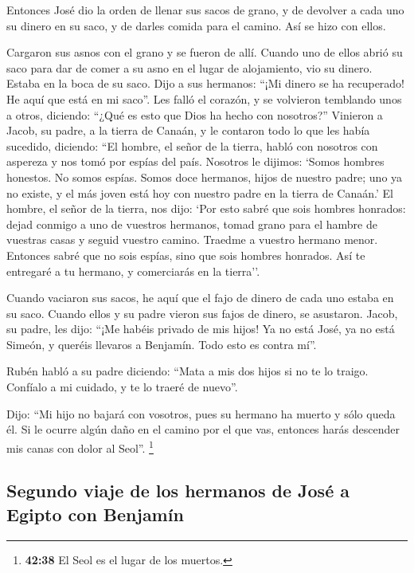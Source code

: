  Entonces José dio la orden de llenar sus sacos de grano,
y de devolver a cada uno su dinero en su saco, y de darles comida para
el camino. Así se hizo con ellos.

 Cargaron sus asnos con el grano y se fueron de allí.
 Cuando uno de ellos abrió su saco para dar de comer a su
asno en el lugar de alojamiento, vio su dinero. Estaba en la boca de su
saco.  Dijo a sus hermanos: ``¡Mi dinero se ha
recuperado! He aquí que está en mi saco''. Les falló el corazón, y se
volvieron temblando unos a otros, diciendo: ``¿Qué es esto que Dios ha
hecho con nosotros?''  Vinieron a Jacob, su padre, a la
tierra de Canaán, y le contaron todo lo que les había sucedido,
diciendo:  ``El hombre, el señor de la tierra, habló con
nosotros con aspereza y nos tomó por espías del país. 
Nosotros le dijimos: `Somos hombres honestos. No somos espías.
 Somos doce hermanos, hijos de nuestro padre; uno ya no
existe, y el más joven está hoy con nuestro padre en la tierra de
Canaán.'  El hombre, el señor de la tierra, nos dijo:
`Por esto sabré que sois hombres honrados: dejad conmigo a uno de
vuestros hermanos, tomad grano para el hambre de vuestras casas y seguid
vuestro camino.  Traedme a vuestro hermano menor.
Entonces sabré que no sois espías, sino que sois hombres honrados. Así
te entregaré a tu hermano, y comerciarás en la tierra''.

 Cuando vaciaron sus sacos, he aquí que el fajo de dinero
de cada uno estaba en su saco. Cuando ellos y su padre vieron sus fajos
de dinero, se asustaron.  Jacob, su padre, les dijo:
``¡Me habéis privado de mis hijos! Ya no está José, ya no está Simeón, y
queréis llevaros a Benjamín. Todo esto es contra mí''.

 Rubén habló a su padre diciendo: ``Mata a mis dos hijos
si no te lo traigo. Confíalo a mi cuidado, y te lo traeré de nuevo''.

 Dijo: ``Mi hijo no bajará con vosotros, pues su hermano
ha muerto y sólo queda él. Si le ocurre algún daño en el camino por el
que vas, entonces harás descender mis canas con dolor al Seol''.
\footnote{\textbf{42:38} El Seol es el lugar de los muertos.}

\hypertarget{segundo-viaje-de-los-hermanos-de-josuxe9-a-egipto-con-benjamuxedn}{%
\subsection{Segundo viaje de los hermanos de José a Egipto con
Benjamín}\label{segundo-viaje-de-los-hermanos-de-josuxe9-a-egipto-con-benjamuxedn}}

